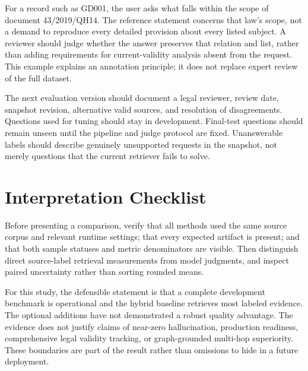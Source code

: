 For a record such as GD001, the user asks what falls within the scope of document 43/2019/QH14. The reference statement concerns that law's scope, not a demand to reproduce every detailed provision about every listed subject. A reviewer should judge whether the answer preserves that relation and list, rather than adding requirements for current-validity analysis absent from the request. This example explains an annotation principle; it does not replace expert review of the full dataset.

The next evaluation version should document a legal reviewer, review date, snapshot revision, alternative valid sources, and resolution of disagreements. Questions used for tuning should stay in development. Final-test questions should remain unseen until the pipeline and judge protocol are fixed. Unanswerable labels should describe genuinely unsupported requests in the snapshot, not merely questions that the current retriever fails to solve.

\section{Interpretation Checklist}
Before presenting a comparison, verify that all methods used the same source corpus and relevant runtime settings; that every expected artifact is present; and that both sample statuses and metric denominators are visible. Then distinguish direct source-label retrieval measurements from model judgments, and inspect paired uncertainty rather than sorting rounded means.

For this study, the defensible statement is that a complete development benchmark is operational and the hybrid baseline retrieves most labeled evidence. The optional additions have not demonstrated a robust quality advantage. The evidence does not justify claims of near-zero hallucination, production readiness, comprehensive legal validity tracking, or graph-grounded multi-hop superiority. These boundaries are part of the result rather than omissions to hide in a future deployment.
